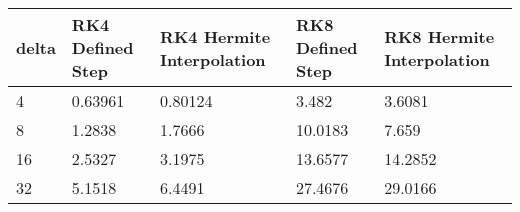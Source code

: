\begin{tabular}{lllll}
delta & RK4 Defined Step & RK4 Hermite Interpolation & RK8 Defined Step & RK8 Hermite Interpolation \\ 
\hline 
4 & 0.63961 & 0.80124 & 3.482 & 3.6081 \\ 
8 & 1.2838 & 1.7666 & 10.0183 & 7.659 \\ 
16 & 2.5327 & 3.1975 & 13.6577 & 14.2852 \\ 
32 & 5.1518 & 6.4491 & 27.4676 & 29.0166 \\ 
\hline 
\end{tabular}